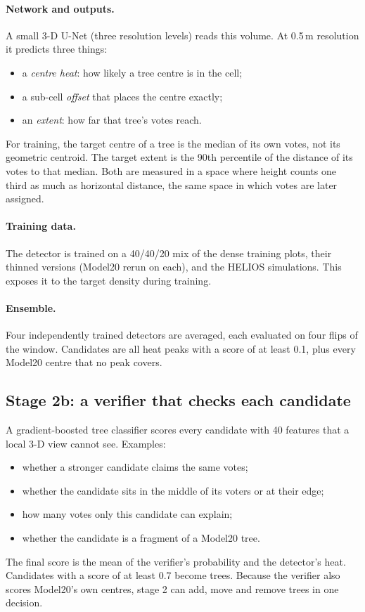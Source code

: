 \documentclass[11pt,a4paper]{article}
\begin{document}
\paragraph{Network and outputs.} A small 3-D U-Net (three resolution levels) reads this volume. At 0.5\,m resolution it predicts three things:
\begin{itemize}
  \item a \emph{centre heat}: how likely a tree centre is in the cell;
  \item a sub-cell \emph{offset} that places the centre exactly;
  \item an \emph{extent}: how far that tree's votes reach.
\end{itemize}
For training, the target centre of a tree is the median of its own votes, not its geometric centroid. The target extent is the 90th percentile of the distance of its votes to that median. Both are measured in a space where height counts one third as much as horizontal distance, the same space in which votes are later assigned.

\paragraph{Training data.} The detector is trained on a 40/40/20 mix of the dense training plots, their thinned versions (Model20 rerun on each), and the HELIOS simulations. This exposes it to the target density during training.

\paragraph{Ensemble.} Four independently trained detectors are averaged, each evaluated on four flips of the window. Candidates are all heat peaks with a score of at least 0.1, plus every Model20 centre that no peak covers.

\subsection{Stage 2b: a verifier that checks each candidate}

A gradient-boosted tree classifier scores every candidate with 40 features that a local 3-D view cannot see. Examples:
\begin{itemize}
  \item whether a stronger candidate claims the same votes;
  \item whether the candidate sits in the middle of its voters or at their edge;
  \item how many votes only this candidate can explain;
  \item whether the candidate is a fragment of a Model20 tree.
\end{itemize}
The final score is the mean of the verifier's probability and the detector's heat. Candidates with a score of at least 0.7 become trees. Because the verifier also scores Model20's own centres, stage 2 can add, move and remove trees in one decision.
\end{document}
